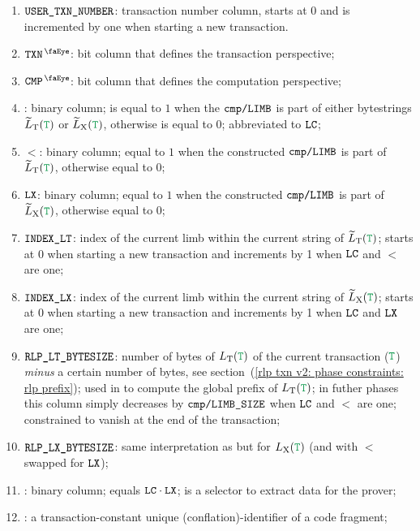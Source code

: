 \begin{enumerate}
    \item $\texttt{USER}\texttt{\_}\texttt{TXN\_NUMBER}$:
	transaction number column, starts at 0 and is incremented by one when starting a new transaction.
    \item $\isTxn$:
	bit column that defines the transaction perspective;
    \item $\isCmp$:
	bit column that defines the computation perspective;
    \item {}:
	binary column;
	is equal to $1$ when the $\texttt{cmp}\texttt{/}\texttt{{\texttt{LIMB}}}$ is part of either \rlp{} bytestrings $\locLtTilde(\locTransaction)$ or $\locLxTilde(\locTransaction)$, otherwise is equal to $0$;
	abbreviated to $\texttt{LC}$;
    \item $\lt$:
	binary column; equal to $1$ when the constructed $\texttt{cmp}\texttt{/}\texttt{{\texttt{LIMB}}}$ is part of $\locLtTilde(\locTransaction)$, otherwise equal to $0$;
    \item $\texttt{LX}$:
	binary column; equal to $1$ when the constructed $\texttt{cmp}\texttt{/}\texttt{{\texttt{LIMB}}}$ is part of $\locLxTilde(\locTransaction)$, otherwise equal to $0$;
    \item $\texttt{INDEX\_LT}$:
	index of the current limb within the current string of $\locLtTilde(\locTransaction)$;
	starts at $0$ when starting a new transaction and increments by 1 when $\texttt{LC}$ and $\lt$ are one; 
    \item $\texttt{INDEX\_LX}$:                                                       
	index of the current limb within the current string of $\locLxTilde(\locTransaction)$;
	starts at $0$ when starting a new transaction and increments by 1 when $\texttt{LC}$ and $\texttt{LX}$ are one;
    \item $\texttt{RLP\_LT\_BYTESIZE}$:
	number of bytes of $L_{\mathrm{T}}(\locTransaction)$ of the current transaction ($\locTransaction$) \emph{minus} a certain number of bytes,
	see section~(\ref{rlp txn v2: phase constraints: rlp prefix});
	used in \phaseRlpPrefix{} to compute the global \rlp{} prefix of $L_{\mathrm{T}}(\locTransaction)$;
	in futher phases this column simply decreases by $\texttt{cmp}\texttt{/}\texttt{{LIMB\_SIZE}}$ when $\texttt{LC}$ and $\lt$ are one;
	constrained to vanish at the end of the transaction;
    \item $\texttt{RLP\_LX\_BYTESIZE}$:
	same interpretation as \rlptsize{} but for $L_{\mathrm{X}}(\locTransaction)$
	(and with $\lt$ swapped for $\texttt{LX}$);
    \item \toHashByProver{}:
	binary column; equals $\texttt{LC} \cdot \texttt{LX}$; is a selector to extract data for the prover;
    \item \CFI{}:
	a transaction-constant unique (conflation)-identifier of a code fragment;
\end{enumerate}
